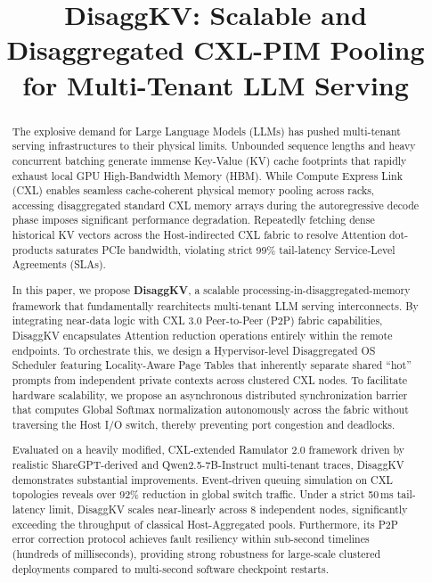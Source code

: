 \documentclass[10pt,conference]{IEEEtran}
\begin{document}
\title{DisaggKV: Scalable and Disaggregated CXL-PIM Pooling for Multi-Tenant LLM Serving}

\author{
}

\maketitle

\begin{abstract}
The explosive demand for Large Language Models (LLMs) has pushed multi-tenant serving infrastructures to their physical limits. Unbounded sequence lengths and heavy concurrent batching generate immense Key-Value (KV) cache footprints that rapidly exhaust local GPU High-Bandwidth Memory (HBM). While Compute Express Link (CXL) enables seamless cache-coherent physical memory pooling across racks, accessing disaggregated standard CXL memory arrays during the autoregressive decode phase imposes significant performance degradation. Repeatedly fetching dense historical KV vectors across the Host-indirected CXL fabric to resolve Attention dot-products saturates PCIe bandwidth, violating strict 99\% tail-latency Service-Level Agreements (SLAs).

In this paper, we propose \textbf{DisaggKV}, a scalable processing-in-disaggregated-memory framework that fundamentally rearchitects multi-tenant LLM serving interconnects. By integrating near-data logic with CXL 3.0 Peer-to-Peer (P2P) fabric capabilities, DisaggKV encapsulates Attention reduction operations entirely within the remote endpoints. To orchestrate this, we design a Hypervisor-level Disaggregated OS Scheduler featuring Locality-Aware Page Tables that inherently separate shared ``hot'' prompts from independent private contexts across clustered CXL nodes. To facilitate hardware scalability, we propose an asynchronous distributed synchronization barrier that computes Global Softmax normalization autonomously across the fabric without traversing the Host I/O switch, thereby preventing port congestion and deadlocks.

Evaluated on a heavily modified, CXL-extended Ramulator 2.0 framework driven by realistic ShareGPT-derived and Qwen2.5-7B-Instruct multi-tenant traces, DisaggKV demonstrates substantial improvements. Event-driven queuing simulation on CXL topologies reveals over 92\% reduction in global switch traffic. Under a strict 50\,ms tail-latency limit, DisaggKV scales near-linearly across 8 independent nodes, significantly exceeding the throughput of classical Host-Aggregated pools. Furthermore, its P2P error correction protocol achieves fault resiliency within sub-second timelines (hundreds of milliseconds), providing strong robustness for large-scale clustered deployments compared to multi-second software checkpoint restarts.
\end{abstract}
\end{document}
